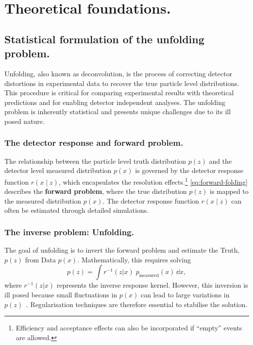 \chapter{Theoretical foundations.}
\label{chap:theoretical-foundations}
\section{Statistical formulation of the unfolding problem.}

Unfolding, also known as deconvolution, is the process of correcting detector distortions in experimental data to recover the true particle level distributions.
%
This procedure is critical for comparing experimental results with theoretical predictions and for enabling detector independent analyses.
%
The unfolding problem is inherently statistical and presents unique challenges due to its ill posed nature.

\subsection{The detector response and forward problem.}

The relationship between the particle level truth distribution \(p(z)\) and the detector level measured distribution \(p(x)\) is governed by the detector response function \(r(x\mid z)\), which encapsulates the resolution effects.\footnote{Efficiency and acceptance effects can also be incorporated if ``empty'' events are allowed.}
%
\cref{eq:forward-folding} describes the \textbf{forward problem}, where the true distribution \(p(z)\) is mapped to the measured distribution \(p(x)\).
%
The detector response function \(r(x\mid z)\) can often be estimated through detailed simulations.

\subsection{The inverse problem: Unfolding.}

The goal of unfolding is to invert the forward problem and estimate the Truth, \(p(z)\) from Data \(p(x)\).
%
Mathematically, this requires solving
\begin{equation}
    \label{eq:inverse-problem}
    p(z) = \int r^{-1}(z|x) \;p_{\text{measured}}(x) \, \dd x,
\end{equation}
where \(r^{-1}(z|x)\) represents the inverse response kernel.
%
However, this inversion is ill posed because small fluctuations in \(p(x)\) can lead to large variations in \(p(z)\)~\cite{2005InverseMeasurements}.
%
Regularisation techniques are therefore essential to stabilise the solution.

